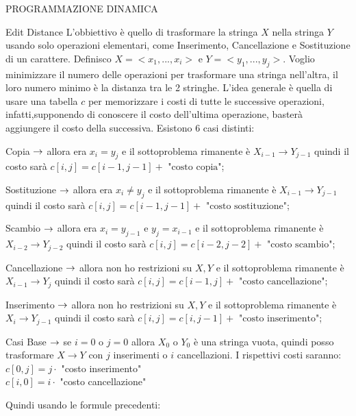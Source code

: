 \documentclass[8pt]{extarticle}
\begin{document}
\begin{formulario}
\begin{myParagraph}{PROGRAMMAZIONE DINAMICA}
		\begin{subParagraph}{Edit Distance}
L'obbiettivo è quello di trasformare la stringa $X$ nella stringa $Y$ usando solo operazioni elementari, come Inserimento, Cancellazione e Sostituzione di un carattere. Definisco $X=<x_1,...,x_i>$ e $Y=<y_1,...,y_j>$. Voglio minimizzare il numero delle operazioni per trasformare una stringa nell'altra, il loro numero minimo è la distanza tra le 2 stringhe. L'idea generale è quella di usare una tabella $c$ per memorizzare i costi di tutte le successive operazioni, infatti,supponendo di conoscere il costo dell'ultima operazione, basterà aggiungere il costo della successiva. Esistono 6 casi distinti:
			\begin{descr}{1}
				\item[Copia] $\ra$ allora era $x_i=y_j$ e il sottoproblema rimanente è $X_{i-1}\to Y_{j-1}$ quindi il costo sarà $c[i,j]=c[i-1,j-1]+\text{ "costo copia"}$;
				\item[Sostituzione] $\ra$ allora era $x_i \neq y_j$ e il sottoproblema rimanente è $X_{i-1}\to Y_{j-1}$ quindi il costo sarà $c[i,j]=c[i-1,j-1]+\text{ "costo sostituzione"}$;
				\item[Scambio] $\ra$ allora era $x_i=y_{j-1}$ e $y_j=x_{i-1}$ e il sottoproblema rimanente è $X_{i-2}\to Y_{j-2}$ quindi il costo sarà $c[i,j]=c[i-2,j-2]+\text{ "costo scambio"}$;
				\item[Cancellazione] $\ra$ allora non ho restrizioni su $X,Y$ e il sottoproblema rimanente è $X_{i-1}\to Y_j$ quindi il costo sarà $c[i,j]=c[i-1,j]+\text{ "costo cancellazione"}$;
				\item[Inserimento] $\ra$ allora non ho restrizioni su $X,Y$ e il sottoproblema rimanente è $X_i\to Y_{j-1}$ quindi il costo sarà $c[i,j]=c[i,j-1]+\text{ "costo inserimento"}$;
				\item[Casi Base] $\ra$ se $i=0$ o $j=0$ allora $X_0$ o $Y_0$ è una stringa vuota, quindi posso trasformare $X\to Y$ con $j$ inserimenti o $i$ cancellazioni. I rispettivi costi saranno:\\
$c[0,j]=j\cdot$ "costo inserimento"\\
$c[i,0]=i\cdot$ "costo cancellazione"\\
			\end{descr}		
Quindi usando le formule precedenti:\\
			\begin{tcenter}
\small{$c[i,j]=\min		
\begin{cases}
c[i-1,j-1]+\text{cost}\proc{(copy)}\qquad\text{se }x[i]=y[j]\\

\end{cases}}
\end{tcenter}
\end{subParagraph}
\end{myParagraph}
\end{formulario}
\end{document}
